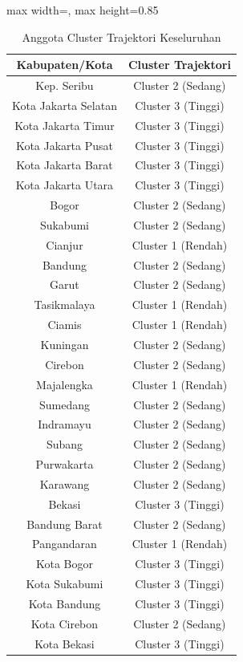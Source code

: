 \begin{table}[H]
\centering
\caption{Anggota Cluster Trajektori Keseluruhan} \label{tab:app1clustermembers}
\begin{adjustbox}{max width=\textwidth, max height=0.85\textheight}
\begin{tabular}{|c|c|}
\hline
\textbf{Kabupaten/Kota} & \textbf{Cluster Trajektori} \\
\hline
Kep. Seribu & Cluster 2 (Sedang) \\
Kota Jakarta Selatan & Cluster 3 (Tinggi) \\
Kota Jakarta Timur & Cluster 3 (Tinggi) \\
Kota Jakarta Pusat & Cluster 3 (Tinggi) \\
Kota Jakarta Barat & Cluster 3 (Tinggi) \\
Kota Jakarta Utara & Cluster 3 (Tinggi) \\
Bogor & Cluster 2 (Sedang) \\
Sukabumi & Cluster 2 (Sedang) \\
Cianjur & Cluster 1 (Rendah) \\
Bandung & Cluster 2 (Sedang) \\
Garut & Cluster 2 (Sedang) \\
Tasikmalaya & Cluster 1 (Rendah) \\
Ciamis & Cluster 1 (Rendah) \\
Kuningan & Cluster 2 (Sedang) \\
Cirebon & Cluster 2 (Sedang) \\
Majalengka & Cluster 1 (Rendah) \\
Sumedang & Cluster 2 (Sedang) \\
Indramayu & Cluster 2 (Sedang) \\
Subang & Cluster 2 (Sedang) \\
Purwakarta & Cluster 2 (Sedang) \\
Karawang & Cluster 2 (Sedang) \\
Bekasi & Cluster 3 (Tinggi) \\
Bandung Barat & Cluster 2 (Sedang) \\
Pangandaran & Cluster 1 (Rendah) \\
Kota Bogor & Cluster 3 (Tinggi) \\
Kota Sukabumi & Cluster 3 (Tinggi) \\
Kota Bandung & Cluster 3 (Tinggi) \\
Kota Cirebon & Cluster 2 (Sedang) \\
Kota Bekasi & Cluster 3 (Tinggi) \\

\end{tabular}
\end{adjustbox}
\end{table}
